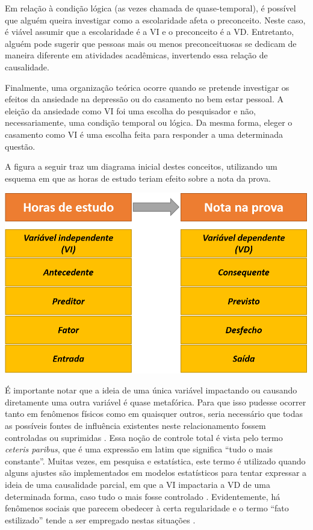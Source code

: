 \documentclass[
]{book}
\begin{document}
Em relação à condição lógica (as vezes chamada de quase-temporal), é possível que alguém queira investigar como a escolaridade afeta o preconceito. Neste caso, é viável assumir que a escolaridade é a VI e o preconceito é a VD. Entretanto, alguém pode sugerir que pessoas mais ou menos preconceituosas se dedicam de maneira diferente em atividades acadêmicas, invertendo essa relação de causalidade.

Finalmente, uma organização teórica ocorre quando se pretende investigar os efeitos da ansiedade na depressão ou do casamento no bem estar pessoal. A eleição da ansiedade como VI foi uma escolha do pesquisador e não, necessariamente, uma condição temporal ou lógica. Da mesma forma, eleger o casamento como VI é uma escolha feita para responder a uma determinada questão.

A figura a seguir traz um diagrama inicial destes conceitos, utilizando um esquema em que as horas de estudo teriam efeito sobre a nota da prova.

\includegraphics{./img/cap_vi_vd.png}

É importante notar que a ideia de uma única variável impactando ou causando diretamente uma outra variável é quase metafórica. Para que isso pudesse ocorrer tanto em fenômenos físicos como em quaisquer outros, seria necessário que todas as possíveis fontes de influência existentes neste relacionamento fossem controladas ou suprimidas \citep{Dumsday2012}. Essa noção de controle total é vista pelo termo \emph{ceteris paribus}, que é uma expressão em latim que significa ``tudo o mais constante''. Muitas vezes, em pesquisa e estatística, este termo é utilizado quando alguns ajustes são implementados em modelos estatísticos para tentar expressar a ideia de uma causalidade parcial, em que a VI impactaria a VD de uma determinada forma, caso tudo o mais fosse controlado \citep{Fennell2005}. Evidentemente, há fenômenos sociais que parecem obedecer à certa regularidade e o termo ``fato estilizado'' tende a ser empregado nestas situações \citep{Hirschman2016}.
\end{document}
